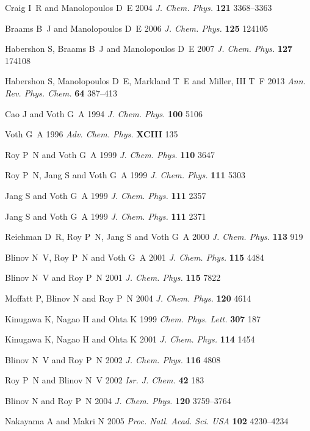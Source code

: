 \documentclass[12pt]{iopart}
\begin{document}
\begin{thebibliography}{100}
Craig I~R and Manolopoulos D~E 2004 {\em J. Chem. Phys.\/} {\bf 121} 3368--3363

Braams B~J and Manolopoulos D~E 2006 {\em J. Chem. Phys.\/} {\bf 125} 124105

Habershon S, Braams B~J and Manolopoulos D~E 2007 {\em J. Chem. Phys.\/} {\bf
  127} 174108

Habershon S, Manolopoulos D~E, Markland T~E and {Miller, III} T~F 2013 {\em
  Ann. Rev. Phys. Chem.\/} {\bf 64} 387--413

Cao J and Voth G~A 1994 {\em J. Chem. Phys.\/} {\bf 100} 5106

Voth G~A 1996 {\em Adv. Chem. Phys.\/} {\bf XCIII} 135

Roy P~N and Voth G~A 1999 {\em J. Chem. Phys.\/} {\bf 110} 3647

Roy P~N, Jang S and Voth G~A 1999 {\em J. Chem. Phys.\/} {\bf 111} 5303

Jang S and Voth G~A 1999 {\em J. Chem. Phys.\/} {\bf 111} 2357

Jang S and Voth G~A 1999 {\em J. Chem. Phys.\/} {\bf 111} 2371

Reichman D~R, Roy P~N, Jang S and Voth G~A 2000 {\em J. Chem. Phys.\/} {\bf
  113} 919

Blinov N~V, Roy P~N and Voth G~A 2001 {\em J. Chem. Phys.\/} {\bf 115} 4484

Blinov N~V and Roy P~N 2001 {\em J. Chem. Phys.\/} {\bf 115} 7822

Moffatt P, Blinov N and Roy P~N 2004 {\em J. Chem. Phys.\/} {\bf 120} 4614

Kinugawa K, Nagao H and Ohta K 1999 {\em Chem. Phys. Lett.\/} {\bf 307} 187

Kinugawa K, Nagao H and Ohta K 2001 {\em J. Chem. Phys.\/} {\bf 114} 1454

Blinov N~V and Roy P~N 2002 {\em J. Chem. Phys.\/} {\bf 116} 4808

Roy P~N and Blinov N~V 2002 {\em Isr. J. Chem.\/} {\bf 42} 183

Blinov N and Roy P~N 2004 {\em J. Chem. Phys.\/} {\bf 120} 3759--3764

Nakayama A and Makri N 2005 {\em Proc. Natl. Acad. Sci. USA\/} {\bf 102}
  4230--4234


\end{thebibliography}
\end{document}
